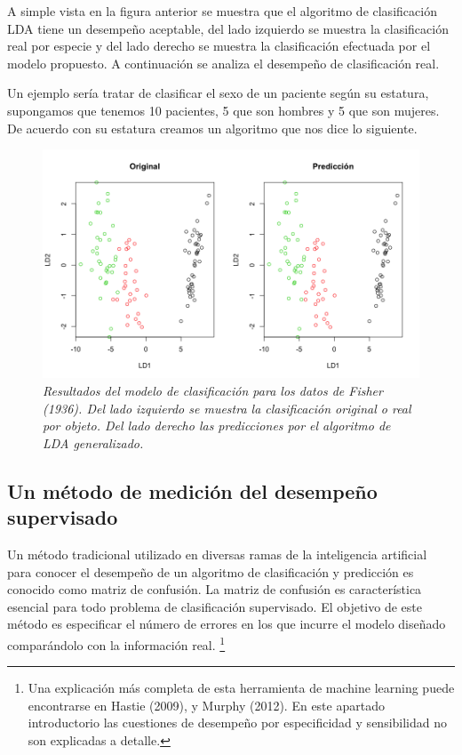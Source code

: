 \documentclass[letterpaper,12pt, spanish, oneside]{book} %
\let\oldfootnote\footnote
\renewcommand{\footnote}[1]{%
  \begingroup%
  \linespread{1.2}%
  \oldfootnote{#1}%
  \endgroup%
}
\begin{document}
A simple vista en la figura anterior se muestra que el algoritmo de clasificación LDA tiene un desempeño aceptable, del lado izquierdo se muestra la clasificación real por especie y del lado derecho se muestra la clasificación efectuada por el modelo propuesto. A continuación se analiza el desempeño de clasificación real. 

Un ejemplo sería tratar de clasificar el sexo de un paciente según  su estatura, supongamos que tenemos 10 pacientes, 5 que son hombres y 5 que son mujeres. De acuerdo con su estatura creamos un algoritmo que nos dice lo siguiente.

\begin{figure}[H]
\centering
\includegraphics[width=1\textwidth]{fase5.png}
\caption{\label{fig:frog2}\textit{Resultados del modelo de clasificación para los datos de Fisher (1936). Del lado izquierdo se muestra la clasificación original o real por objeto. Del lado derecho las predicciones por el algoritmo de LDA generalizado.}}
\end{figure}

\subsection{Un método de medición del desempeño supervisado}

Un método tradicional utilizado en diversas ramas de la inteligencia artificial para conocer el desempeño de un algoritmo de clasificación y predicción es conocido como matriz de confusión. La matriz de confusión es característica esencial para todo problema de clasificación supervisado. El objetivo de este método es especificar el número de errores en los que incurre el modelo diseñado comparándolo con la información real.\footnote{ Una explicación más completa de esta herramienta de machine learning puede encontrarse en Hastie (2009), y Murphy (2012). En este apartado introductorio las cuestiones de desempeño por especificidad y sensibilidad no son explicadas a detalle.}
\end{document}
